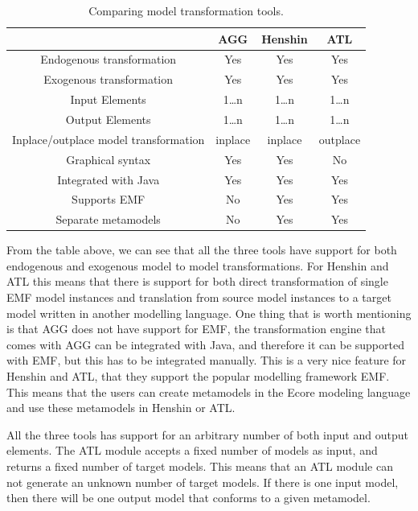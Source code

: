 \begin{table}[ht]
\centering
\begin{tabular}{| c | c | c | c |}
\hline
 & AGG & Henshin & ATL \\
\hline
Endogenous transformation & \cellcolor{green!25}Yes &
\cellcolor{green!25}Yes & \cellcolor{green!25}Yes \\

Exogenous transformation & \cellcolor{green!25}Yes &
\cellcolor{green!25}Yes & \cellcolor{green!25}Yes \\

Input Elements & 1\ldots n & 1\ldots n & 1\ldots n\\
Output Elements & 1\ldots n & 1\ldots n & 1\ldots n\\
Inplace/outplace model transformation &inplace &
inplace &outplace \\
Graphical syntax &\cellcolor{green!25}Yes &
\cellcolor{green!25}Yes &\cellcolor{red!25}No  \\
Integrated with Java & \cellcolor{green!25}Yes &
\cellcolor{green!25}Yes & \cellcolor{green!25}Yes \\
Supports EMF & \cellcolor{red!25}No &
\cellcolor{green!25}Yes & \cellcolor{green!25}Yes \\
Separate metamodels & \cellcolor{red!25}No &
\cellcolor{green!25}Yes & \cellcolor{green!25}Yes \\
\hline

\end{tabular}
\caption{Comparing model transformation tools.}
\end{table}

From the table above, we can see that all the three tools have support for both
endogenous and exogenous model to model transformations. For Henshin and ATL
this means that there is support for both direct transformation of single EMF
model instances and translation from source model instances to a target model
written in another modelling language. One thing that is worth mentioning is
that AGG does not have support for EMF, the transformation engine that comes
with AGG can be integrated with Java, and therefore it can be supported with
EMF, but this has to be integrated manually. This is a very nice feature for
Henshin and ATL, that they support the popular modelling framework EMF. This
means that the users can create metamodels in the Ecore modeling language and
use these metamodels in Henshin or ATL. 

All the three tools has support for an arbitrary number of both input and output
elements. The ATL module accepts a fixed number of models as input, and returns
a fixed number of target models. This means that an ATL module can not generate
an unknown number of target models. If there is one input model, then there
will be one output model that conforms to a given metamodel.

